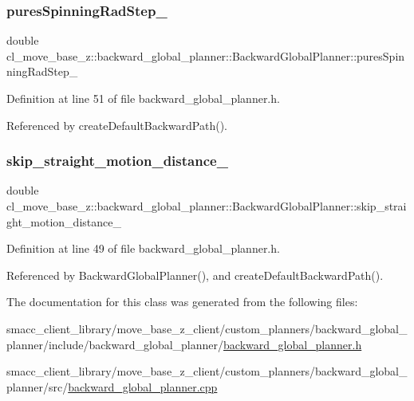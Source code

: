 \subsubsection{\texorpdfstring{pures\+Spinning\+Rad\+Step\+\_\+}{puresSpinningRadStep\_}}
{\footnotesize\ttfamily double cl\+\_\+move\+\_\+base\+\_\+z\+::backward\+\_\+global\+\_\+planner\+::\+Backward\+Global\+Planner\+::pures\+Spinning\+Rad\+Step\+\_\+\hspace{0.3cm}{\ttfamily [private]}}



Definition at line 51 of file backward\+\_\+global\+\_\+planner.\+h.



Referenced by create\+Default\+Backward\+Path().

\mbox{\label{classcl__move__base__z_1_1backward__global__planner_1_1BackwardGlobalPlanner_a045290b931b816b84ced2cfb6c39fcce}} 
\subsubsection{\texorpdfstring{skip\+\_\+straight\+\_\+motion\+\_\+distance\+\_\+}{skip\_straight\_motion\_distance\_}}
{\footnotesize\ttfamily double cl\+\_\+move\+\_\+base\+\_\+z\+::backward\+\_\+global\+\_\+planner\+::\+Backward\+Global\+Planner\+::skip\+\_\+straight\+\_\+motion\+\_\+distance\+\_\+\hspace{0.3cm}{\ttfamily [private]}}



Definition at line 49 of file backward\+\_\+global\+\_\+planner.\+h.



Referenced by Backward\+Global\+Planner(), and create\+Default\+Backward\+Path().



The documentation for this class was generated from the following files\+:\begin{DoxyCompactItemize}
\item 
smacc\+\_\+client\+\_\+library/move\+\_\+base\+\_\+z\+\_\+client/custom\+\_\+planners/backward\+\_\+global\+\_\+planner/include/backward\+\_\+global\+\_\+planner/\hyperlink{backward__global__planner_8h}{backward\+\_\+global\+\_\+planner.\+h}\item 
smacc\+\_\+client\+\_\+library/move\+\_\+base\+\_\+z\+\_\+client/custom\+\_\+planners/backward\+\_\+global\+\_\+planner/src/\hyperlink{backward__global__planner_8cpp}{backward\+\_\+global\+\_\+planner.\+cpp}\end{DoxyCompactItemize}
